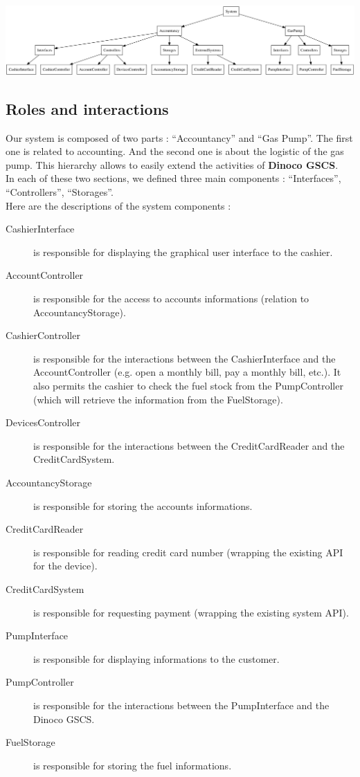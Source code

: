 \documentclass[11pt, a4paper]{article}
\begin{document}
\begin{center}
\centerline{\includegraphics[width=1.3\textwidth]{hierarchical.png}}
\end{center}

\subsection{Roles and interactions}

Our system is composed of two parts : ``Accountancy'' and ``Gas Pump''. The first one is related to accounting. And the second one is about the logistic of the gas pump. This hierarchy allows to easily extend the activities of \textbf{Dinoco GSCS}.\\




In each of these two sections, we defined three main components : ``Interfaces'', ``Controllers'', ``Storages''.\\


Here are the descriptions of the system components :
\begin{description}
\item[CashierInterface] is responsible for displaying the graphical user interface to the cashier.
\item[AccountController] is responsible for the access to accounts informations (relation to AccountancyStorage).
\item[CashierController] is responsible for the interactions between the CashierInterface and the AccountController (e.g. open a monthly bill, pay a monthly bill, etc.). It also permits the cashier to check the fuel stock from the PumpController (which will retrieve the information from the FuelStorage). 
\item[DevicesController] is responsible for the interactions between the CreditCardReader and the CreditCardSystem. 
\item[AccountancyStorage] is responsible for storing the accounts informations.
\item[CreditCardReader] is responsible for reading credit card number (wrapping the existing API for the device).
\item[CreditCardSystem] is responsible for requesting payment (wrapping the existing system API).
\item[PumpInterface] is responsible for displaying informations to the customer.
\item[PumpController] is responsible for the interactions between the PumpInterface and the Dinoco GSCS.
\item[FuelStorage] is responsible for storing the fuel informations.
\end{description}
\end{document}

